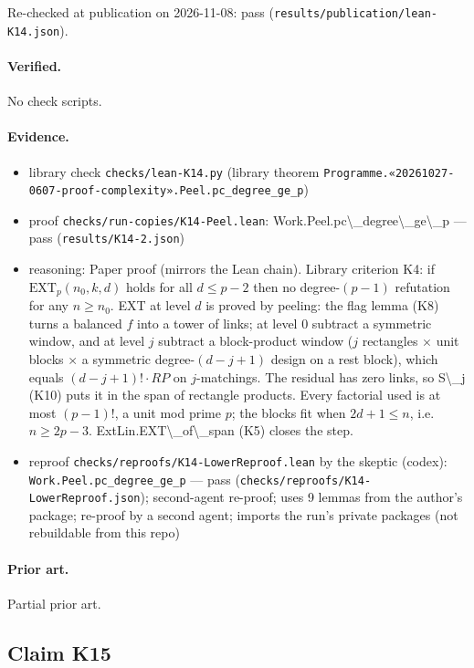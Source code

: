 \documentclass{article}
\begin{document}
Re-checked at publication on 2026-11-08: pass (\texttt{results/publication/lean-K14.json}).

\paragraph{Verified.}
No check scripts.

\paragraph{Evidence.}
\begin{itemize}
\item library check \texttt{checks/lean-K14.py} (library theorem \texttt{Programme.«20261027-0607-proof-complexity».Peel.pc\_degree\_ge\_p})
\item proof \texttt{checks/run-copies/K14-Peel.lean}: Work.Peel.pc\textbackslash{}\_degree\textbackslash{}\_ge\textbackslash{}\_p --- pass (\texttt{results/K14-2.json})
\item reasoning: Paper proof (mirrors the Lean chain). Library criterion K4: if $\mathrm{EXT}_p(n_0,k,d)$ holds for all $d\le p-2$ then no degree-$(p-1)$ refutation for any $n\ge n_0$. EXT at level $d$ is proved by peeling: the flag lemma (K8) turns a balanced $f$ into a tower of links; at level 0 subtract a symmetric window, and at level $j$ subtract a block-product window ($j$ rectangles $\times$ unit blocks $\times$ a symmetric degree-$(d-j+1)$ design on a rest block), which equals $(d-j+1)!\cdot RP$ on $j$-matchings. The residual has zero links, so S\textbackslash{}\_j (K10) puts it in the span of rectangle products. Every factorial used is at most $(p-1)!$, a unit mod prime $p$; the blocks fit when $2d+1\le n$, i.e. $n\ge2p-3$. ExtLin.EXT\textbackslash{}\_of\textbackslash{}\_span (K5) closes the step.
\item reproof \texttt{checks/reproofs/K14-LowerReproof.lean} by the skeptic (codex): \texttt{Work.Peel.pc\_degree\_ge\_p} --- pass (\texttt{checks/reproofs/K14-LowerReproof.json}); second-agent re-proof; uses 9 lemmas from the author's package; re-proof by a second agent; imports the run's private packages (not rebuildable from this repo)
\end{itemize}

\paragraph{Prior art.} Partial prior art.

\subsection*{Claim K15}
\end{document}
